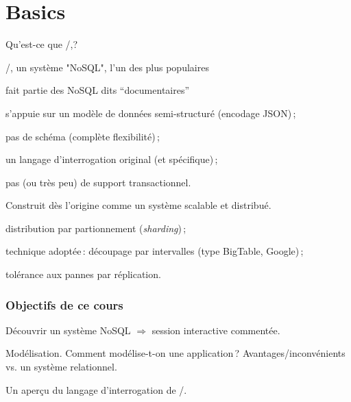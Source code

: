 

\section{Basics}

\begin{frame}{Qu'est-ce que \mongodb/,?}


\mongodb/, un système "NoSQL", l'un des plus populaires

\begin{redbullet}
  \item fait partie des NoSQL dits ``documentaires''

  \item s'appuie sur un modèle de données semi-structuré (encodage JSON)\,;
  \item pas de schéma (complète flexibilité)\,;
  \item un \alert{langage d'interrogation} original (et spécifique)\,;
   \item pas (ou très peu) de \alert{support transactionnel}.
   \end{redbullet}
   \vfill
   
Construit dès l'origine comme un système \alert{scalable} et \alert{distribué}.

\begin{redbullet}
 \item distribution par partionnement (\textit{sharding})\,;
  \item technique adoptée\,: découpage par intervalles (type BigTable, Google)\,;
  \item tolérance aux pannes par réplication.
\end{redbullet}   

\end{frame}


\begin{frame}
\frametitle{Objectifs de ce cours}


\alert{Découvrir un système NoSQL} $\Rightarrow$ session interactive commentée.

\vfill

\alert{Modélisation}. Comment modélise-t-on une application\,? 
Avantages/inconvénients vs. un système relationnel.

\vfill

Un aperçu du \alert{langage d'interrogation} de \mongodb/.

\end{frame}


